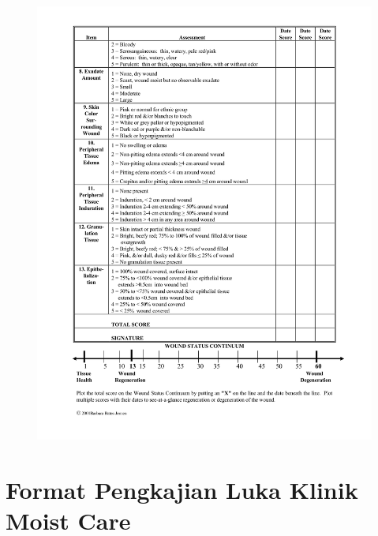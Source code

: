 \begin{figure}[H]
	\centering
	\includegraphics[keepaspectratio, width=14cm]{gambar/BWAT-4}
	\label{gambar:bwat_4}
\end{figure}

\chapter{Format Pengkajian Luka Klinik Moist Care}

